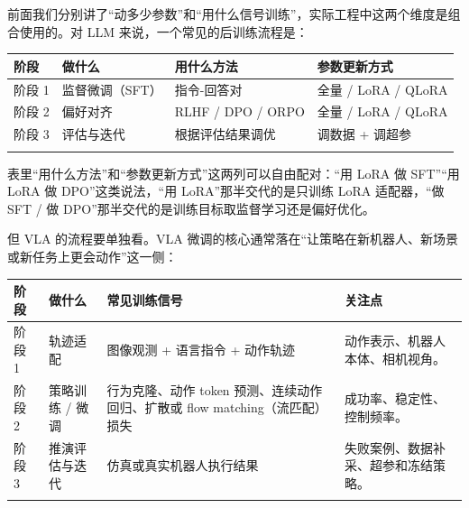 \documentclass[
  chinese,
]{ctexart}
\begin{document}
前面我们分别讲了``动多少参数''和``用什么信号训练''，实际工程中这两个维度是组合使用的。对
LLM 来说，一个常见的后训练流程是：

\begin{center}
\begin{tabular}{@{}>{\raggedright\arraybackslash}p{} >{\raggedright\arraybackslash}p{} >{\raggedright\arraybackslash}p{} >{\raggedright\arraybackslash}p{}@{}}
\toprule\noalign{}
阶段 & 做什么 & 用什么方法 & 参数更新方式 \\
\midrule\noalign{}
阶段 1 & 监督微调（SFT） & 指令-回答对 & 全量 / LoRA / QLoRA \\
阶段 2 & 偏好对齐 & RLHF / DPO / ORPO & 全量 / LoRA / QLoRA \\
阶段 3 & 评估与迭代 & 根据评估结果调优 & 调数据 + 调超参 \\
\bottomrule\noalign{}
\end{tabular}
\end{center}

表里``用什么方法''和``参数更新方式''这两列可以自由配对：``用 LoRA 做
SFT''``用 LoRA 做 DPO''这类说法，``用 LoRA''那半交代的是只训练 LoRA
适配器，``做 SFT / 做 DPO''那半交代的是训练目标取监督学习还是偏好优化。

但 VLA 的流程要单独看。VLA
微调的核心通常落在``让策略在新机器人、新场景或新任务上更会动作''这一侧：

\begin{center}
\begin{tabular}{@{}>{\raggedright\arraybackslash}p{} >{\raggedright\arraybackslash}p{} >{\raggedright\arraybackslash}p{} >{\raggedright\arraybackslash}p{}@{}}
\toprule\noalign{}
阶段 & 做什么 & 常见训练信号 & 关注点 \\
\midrule\noalign{}
阶段 1 & 轨迹适配 & 图像观测 + 语言指令 + 动作轨迹 & 动作表示、机器人本体、相机视角。 \\
阶段 2 & 策略训练 / 微调 & 行为克隆、动作 token 预测、连续动作回归、扩散或 flow matching（流匹配）损失 & 成功率、稳定性、控制频率。 \\
阶段 3 & 推演评估与迭代 & 仿真或真实机器人执行结果 & 失败案例、数据补采、超参和冻结策略。 \\
\bottomrule\noalign{}
\end{tabular}
\end{center}
\end{document}
